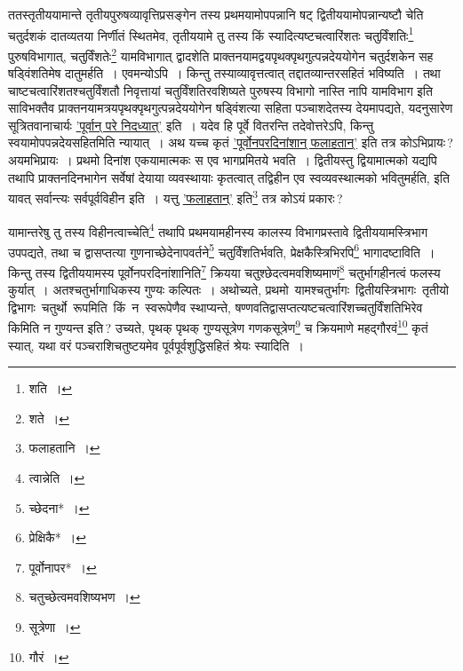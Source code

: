 \documentclass[10pt, openany]{book}
\begin{document}
{{{ततस्तृतीययामान्ते तृतीयपुरुषव्यावृत्तिप्रसङ्गेन तस्य प्रथमयामोपपन्नानि षट् द्वितीययामोपन्नान्यष्टौ
चेति चतुर्दशकं दातव्यतया}
{निर्णीतं स्थितमेव, तृतीययामे तु तस्य किं
स्यादित्यष्टचत्वारिंशतः चतुर्विंशतिः\renewcommand{\thefootnote}{\s ६}\footnote{\s *शति~।} पुरुषविभागात्}, {चतुर्विंशतेः\renewcommand{\thefootnote}{\s ७}\footnote{\s *शते~।} यामविभागात् द्वादशेति
प्राक्तनयामद्वयपृथक्पृथगुत्पन्नदेययोगेन चतुर्दशकेन सह षड्विंशतिमेष दातुमर्हति~। एवमन्योऽपि~। किन्तु तस्याव्यावृत्तत्वात्
तद्दातव्यान्तरसहितं भविष्यति~।}
{तथा चाष्टचत्वारिंशतश्चतुर्विंशतौ निवृत्तायां चतुर्विंशतिरवशिष्यते
पुरुषस्य विभागो नास्ति}
{नापि यामविभाग इति साविभक्तैव प्राक्तनयामत्रयपृथक्पृथगुत्पन्नदेययोगेन
षड्विंशत्या सहिता}
{पञ्चाशदेतस्य देयमापद्यते, यदनुसारेण सूत्रितवानाचार्यः \hyperref[68]{'पूर्वान् परे निदध्यात्'} इति~। यदेव हि}
{पूर्वे वितरन्ति तदेवोत्तरेऽपि, किन्तु स्वयामोपपन्नदेयसहितमिति न्यायात्~। अथ यच्च कृतं \hyperref[68]{'पूर्वोनपरदिनांशान् फलाहतान्'} इति तत्र कोऽभिप्रायः\,? अयमभिप्रायः~। प्रथमो
दिनांश एकयामात्मकः स एव भागप्रमितये भवति~। द्वितीयस्तु द्वियामात्मको यद्यपि
तथापि प्राक्तनदिनभागेन सर्वेषां देयाया व्यवस्थायाः कृतत्वात् तद्विहीन एव
स्वव्यवस्थात्मको भवितुमर्हति,}
{इति यावत् सर्वान्त्यः सर्वपूर्वविहीन इति~। यत्तु \hyperref[68]{'फलाहतान्'} इति\renewcommand{\thefootnote}{\s ८}\footnote{\s फलाहतानि~।} तत्र
कोऽयं प्रकारः\,? }

\newpage

{यामान्तरेषु तु तस्य विहीनत्वाच्चेति\renewcommand{\thefootnote}{\s १}\footnote{\s *त्वान्नेति~।} तथापि प्रथमयामहीनस्य कालस्य
विभागप्रस्तावे}
{द्वितीययामस्त्रिभाग उपपद्यते, तथा च द्वासप्तत्या
गुणनाच्छेदेनापवर्तने\renewcommand{\thefootnote}{\s २}\footnote{\s *च्छेदना*~।} चतुर्विंशतिर्भवति,}
{प्रेक्षकैस्त्रिभिरपि\renewcommand{\thefootnote}{\s ३}\footnote{\s प्रेक्षिकै*~।} भागादष्टाविति~। किन्तु तस्य द्वितीययामस्य
पूर्वोनपरदिनांशानिति\renewcommand{\thefootnote}{\s ४}\footnote{\s पूर्वोनापर*~।} क्रियया}
{चतुश्छेदत्वमवशिष्यमाणं\renewcommand{\thefootnote}{\s ५}\footnote{\s चतुच्छेत्वमवशिष्यभण~।} चतुर्भागहीनत्वं फलस्य कुर्यात्~।
अतश्चतुर्भागाधिकस्य गुण्यः कल्पितः~।}
{अथोच्यते, प्रथमो \,यामश्चतुर्भागः \,द्वितीयस्त्रिभागः \,तृतीयो \,द्विभागः \,चतुर्थो \,रूपमिति \,किं \,न \,स्वरूपेणैव स्थाप्यन्ते,
षण्णवतिद्वासप्तत्यष्टचत्वारिंशच्चतुर्विंशतिभिरेव किमिति न गुण्यन्त}
{इति\,? उच्यते, पृथक् पृथक् गुण्यसूत्रेण गणकसूत्रेण\renewcommand{\thefootnote}{\s ६}\footnote{\s *सूत्रेणा~।} च क्रियमाणे
महद्गौरवं\renewcommand{\thefootnote}{\s ७}\footnote{\s *गौरं~।} कृतं स्यात्, यथा}
{वरं पञ्चराशिचतुष्टयमेव पूर्वपूर्वशुद्धिसहितं श्रेयः स्यादिति~।}
\vspace{3mm}

}}
\end{document}
